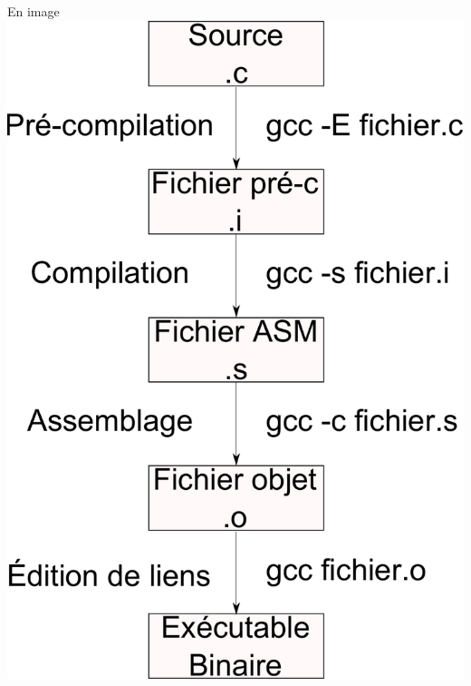 \def\ftitle{En image}
\begin{frame}[containsverbatim]{\ftitle}
\includegraphics[height=.9\textheight]{images/source2bin.pdf}
\end{frame}


